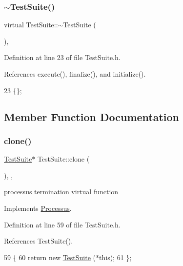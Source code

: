 \subsubsection{\texorpdfstring{$\sim$\+Test\+Suite()}{~TestSuite()}}
{\footnotesize\ttfamily virtual Test\+Suite\+::$\sim$\+Test\+Suite (\begin{DoxyParamCaption}{ }\end{DoxyParamCaption})\hspace{0.3cm}{\ttfamily [inline]}, {\ttfamily [virtual]}}



Definition at line 23 of file Test\+Suite.\+h.



References execute(), finalize(), and initialize().


\begin{DoxyCode}
23 \{\}; 
\end{DoxyCode}


\subsection{Member Function Documentation}
\mbox{\label{classTestSuite_a949558c82561fd2b3548f0d050accab8}} 
\subsubsection{\texorpdfstring{clone()}{clone()}}
{\footnotesize\ttfamily \hyperlink{classTestSuite_1_1TestSuite}{Test\+Suite}$\ast$ Test\+Suite\+::clone (\begin{DoxyParamCaption}{ }\end{DoxyParamCaption})\hspace{0.3cm}{\ttfamily [inline]}, {\ttfamily [protected]}, {\ttfamily [virtual]}}

processus termination virtual function 

Implements \hyperlink{classProcessus_aca8856f6d6d7b7e1fe941f298dcbb502}{Processus}.



Definition at line 59 of file Test\+Suite.\+h.



References Test\+Suite().


\begin{DoxyCode}
59                     \{
60     \textcolor{keywordflow}{return} \textcolor{keyword}{new} \hyperlink{classTestSuite_af7291e6d8b53443604ee0c1fcf1fadfc}{TestSuite} (*\textcolor{keyword}{this});
61   \};
\end{DoxyCode}
\mbox{\label{classTestSuite_a531665e9bba1edb96a3ffdd421f642e2}} 
